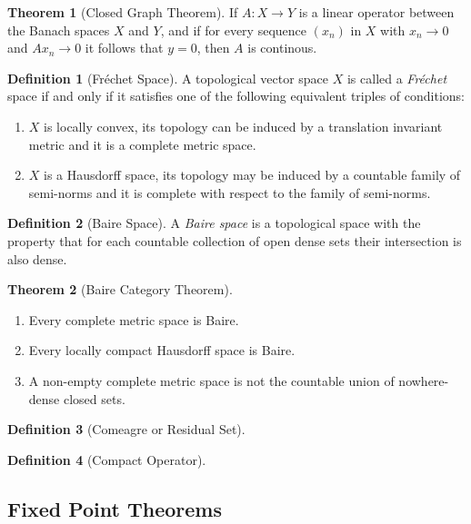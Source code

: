 \documentclass[a4paper]{article}
\newcommand{\lra}{\longrightarrow}
\theoremstyle{definition}
\newtheorem{thm}{Theorem}
\theoremstyle{definition}
\newtheorem{definition}{Definition}
\theoremstyle{remark}
\theoremstyle{remark}
\theoremstyle{remark}
\begin{document}
\begin{thm}[Closed Graph Theorem]
   If $A:X\lra Y$ is a linear operator between the Banach spaces $X$ and $Y$, and if for every sequence $(x_n)$ in $X$ with $x_n\lra 0$ and $Ax_n\lra 0$ it follows that $y=0$, then $A$ is continous.
\end{thm}

\begin{definition}[Fr\'echet Space]
  A topological vector space $X$ is called a \emph{Fr\'echet} space if and only if it satisfies one of the following equivalent triples of conditions:
  \begin{enumerate}
    \item $X$ is locally convex, its topology can be induced by a translation invariant metric and it is a complete metric space.
    \item $X$ is a Hausdorff space, its topology may be induced by a countable family of semi-norms and it is complete with respect to the family of semi-norms.
  \end{enumerate}
\end{definition}

\begin{definition}[Baire Space]
  A \emph{Baire space} is a topological space with the property that for each countable collection of open dense sets their intersection is also dense.
\end{definition}

\begin{thm}[Baire Category Theorem]
  \begin{enumerate}
    \item Every complete metric space is Baire.
    \item Every locally compact Hausdorff space is Baire.
    \item A non-empty complete metric space is not the countable union of nowhere-dense closed sets.
  \end{enumerate}
\end{thm}

\begin{definition}[Comeagre or Residual Set]
  
\end{definition}

\begin{definition}[Compact Operator]
  
\end{definition}

\subsection{Fixed Point Theorems}
\end{document}
